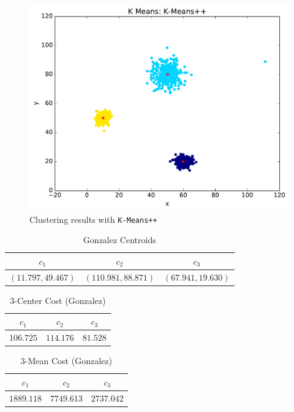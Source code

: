 \documentclass[11pt]{article}
\begin{document}
\begin{figure}[H]
\centering
\includegraphics[width=.75\textwidth]{kmeanspp.pdf}
\caption{Clustering results with {\tt K-Means++}}
\end{figure}



\begin{table}[H]
\centering
\caption{Gonzalez Centroids}
\begin{tabular}{c c c}
\hline\hline
$c_{1}$ & $c_{2}$ & $c_{3}$\\
\hline
$(11.797, 49.467)$ & $(110.981, 88.871)$ & $(67.941, 19.630)$\\
\hline
\end{tabular}
\end{table}



\begin{table}[H]
\centering
\caption{$3$-Center Cost (Gonzalez)}
\begin{tabular}{c c c}
\hline\hline
$c_{1}$ & $c_{2}$ & $c_{3}$\\
\hline
$106.725$ & $114.176$ & $81.528$\\
\hline
\end{tabular}
\end{table}

\begin{table}[H]
\centering
\caption{$3$-Mean Cost (Gonzalez)}
\begin{tabular}{c c c}
\hline\hline
$c_{1}$ & $c_{2}$ & $c_{3}$\\
\hline
$1889.118$ & $7749.613$ & $2737.042$\\
\hline
\end{tabular}
\end{table}
\end{document}

